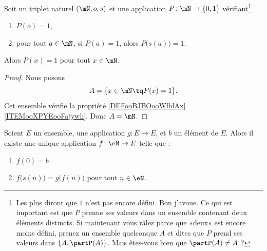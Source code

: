 \begin{proposition}      \label{PROPooXTRCooKwrWkq}
	Soit un triplet naturel \( (\mN,o,s)\) et une application \( P\colon \mN\to \{ 0,1 \}\) vérifiant\footnote{Les plus  diront que \( 1\) n'est pas encore défini. Bon j'avoue. Ce qui est important est que \( P\) prenne ses valeurs dans un ensemble contenant deux éléments distincts. Si maintenant vous râlez parce que «deux» est encore moins défini, prenez un ensemble quelconque \( A\) et dites que \( P\) prend ses valeurs dans \( \{ A, \partP(A)\}\). Mais êtes-vous bien  que \( \partP(A)\neq A\) ?}
	\begin{enumerate}
		\item	\label{ITEMooRecurPropInit}
		      \( P(o) = 1\),
		\item	\label{ITEMooRecurPropHered}
		      pour tout \( a\in \mN\), si \( P(a)=1\), alors \( P\big( s(a) \big)=1\).
	\end{enumerate}
	Alors \( P(x)=1\) pour tout \( x\in \mN\).
\end{proposition}

\begin{proof}
	Nous posons
	\begin{equation}
		A=\{ x\in\mN\tq P(x)=1 \}.
	\end{equation}
	Cet ensemble vérifie la propriété \ref{DEFooBJBOooWlblAx}\ref{ITEMooXPYEooFajywh}. Donc \( A=\mN\).
\end{proof}

\begin{theorem}       \label{THOooEJPYooZFVnez}
	Soient \( E\) un ensemble, une application \(g \colon E\to E  \), et \( b\) un élément de \( E\).  Alors il existe une unique application \( f\colon \eN\to E\) telle que :
	\begin{enumerate}
		\item
		      \( f(0)=b\)
		\item
		      \( f\big( s(n) \big)=g\big( f(n) \big)\) pour tout \( n\in \eN \).
	\end{enumerate}
\end{theorem}

